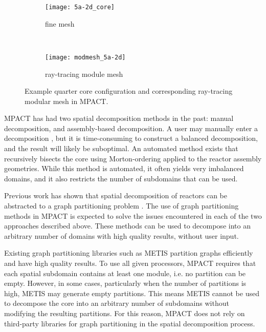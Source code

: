 {{    \begin{figure}
      \centering
      \begin{subfigure}[t]{0.45\textwidth}
        \centering
        \texttt{[image: 5a-2d\_core]}
        \caption{fine mesh\label{fig:Spatial Decomposition:5a-2d configuration}}
      \end{subfigure}%
      ~
      \begin{subfigure}[t]{0.45\textwidth}
        \centering
        \texttt{[image: modmesh\_5a-2d]}
        \caption{ray-tracing module mesh\label{fig:Spatial Decomposition:5a-2d modular mesh}}
      \end{subfigure}
      \caption{Example quarter core configuration and corresponding ray-tracing modular mesh in MPACT. \label{fig:Spatial Decomposition:5a-2d abstraction}}
    \end{figure}

    MPACT has had two spatial decomposition methods in the past: manual decomposition, and assembly-based decomposition.
    A user may manually enter a decomposition \cite{StimpsonPartitioning2017}, but it is time-consuming to construct a balanced decomposition, and the result will likely be suboptimal.
    An automated method exists that recursively bisects the core using Morton-ordering \cite{Morton1966} applied to the reactor assembly geometries.
    While this method is automated, it often yields very imbalanced domains, and it also restricts the number of subdomains that can be used.

    Previous work has shown that spatial decomposition of reactors can be abstracted to a graph partitioning problem \cite{Fitzgerald2017}.
    The use of graph partitioning methods in MPACT is expected to solve the issues encountered in each of the two approaches described above.
    These methods can be used to decompose into an arbitrary number of domains with high quality results, without user input.

    Existing graph partitioning libraries such as METIS \cite{METIS} partition graphs efficiently and have high quality results.
    To use all given processors, MPACT requires that each spatial subdomain contains at least one module, i.e. no partition can be empty.
    However, in some cases, particularly when the number of partitions is high, METIS may generate empty partitions.
    This means METIS cannot be used to decompose the core into an arbitrary number of subdomains without modifying the resulting partitions.
    For this reason, MPACT does not rely on third-party libraries for graph partitioning in the spatial decomposition process.
  }
}
